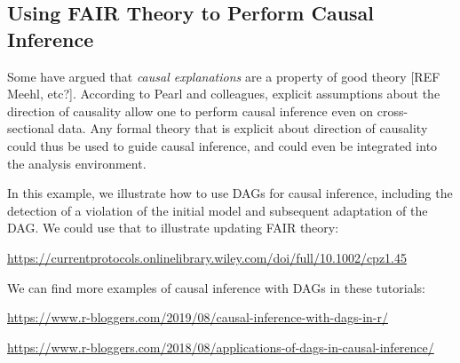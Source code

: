 \documentclass[
  man]{apa6}
\begin{document}
\subsection{Using FAIR Theory to Perform Causal Inference}\label{using-fair-theory-to-perform-causal-inference}

Some have argued that \emph{causal explanations} are a property of good theory {[}REF Meehl, etc?{]}.
According to Pearl and colleagues,
explicit assumptions about the direction of causality allow one to perform causal inference even on cross-sectional data.
Any formal theory that is explicit about direction of causality could thus be used to guide causal inference,
and could even be integrated into the analysis environment.

In this example, we illustrate how to use DAGs for causal inference, including the detection of a violation of the initial model and subsequent adaptation of the DAG. We could use that to illustrate updating FAIR theory:

\url{https://currentprotocols.onlinelibrary.wiley.com/doi/full/10.1002/cpz1.45}

We can find more examples of causal inference with DAGs in these tutorials:

\url{https://www.r-bloggers.com/2019/08/causal-inference-with-dags-in-r/}

\url{https://www.r-bloggers.com/2018/08/applications-of-dags-in-causal-inference/}
\end{document}
